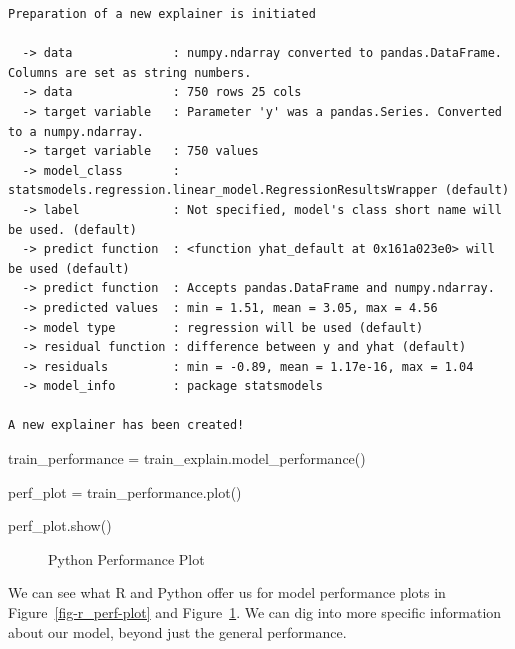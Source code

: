 \documentclass[
  letterpaper,
]{krantz}
\newenvironment{Shaded}{}{}
\newcommand{\NormalTok}[1]{#1}
\newcommand{\OperatorTok}[1]{\textcolor[rgb]{0.40,0.40,0.40}{#1}}
\begin{document}
\begin{verbatim}
Preparation of a new explainer is initiated

  -> data              : numpy.ndarray converted to pandas.DataFrame. Columns are set as string numbers.
  -> data              : 750 rows 25 cols
  -> target variable   : Parameter 'y' was a pandas.Series. Converted to a numpy.ndarray.
  -> target variable   : 750 values
  -> model_class       : statsmodels.regression.linear_model.RegressionResultsWrapper (default)
  -> label             : Not specified, model's class short name will be used. (default)
  -> predict function  : <function yhat_default at 0x161a023e0> will be used (default)
  -> predict function  : Accepts pandas.DataFrame and numpy.ndarray.
  -> predicted values  : min = 1.51, mean = 3.05, max = 4.56
  -> model type        : regression will be used (default)
  -> residual function : difference between y and yhat (default)
  -> residuals         : min = -0.89, mean = 1.17e-16, max = 1.04
  -> model_info        : package statsmodels

A new explainer has been created!
\end{verbatim}

\begin{Shaded}
\begin{Highlighting}[]

\NormalTok{train\_performance }\OperatorTok{=}\NormalTok{ train\_explain.model\_performance()}

\NormalTok{perf\_plot }\OperatorTok{=}\NormalTok{ train\_performance.plot()}
\end{Highlighting}
\end{Shaded}

\begin{Shaded}
\begin{Highlighting}[]
\NormalTok{perf\_plot.show()}
\end{Highlighting}
\end{Shaded}

\begin{figure}

{\centering 

}

\caption{\label{fig-py_perf-plot}Python Performance Plot}

\end{figure}

We can see what R and Python offer us for model performance plots in
Figure~\ref{fig-r_perf-plot} and Figure~\ref{fig-py_perf-plot}. We can
dig into more specific information about our model, beyond just the
general performance.
\end{document}
